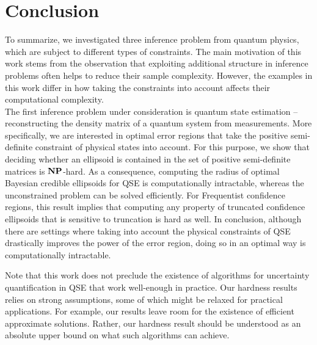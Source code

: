 
\chapter{Conclusion}%
\label{chap:conclusion}

To summarize, we investigated three inference problem from quantum physics, which are subject to different types of constraints.
The main motivation of this work stems from the observation that exploiting additional structure in inference problems often helps to reduce their sample complexity.
However, the examples in this work differ in how taking the constraints into account affects their computational complexity.\\



The first inference problem under consideration is quantum state estimation -- reconstructing the density matrix of a quantum system from measurements.
More specifically, we are interested in optimal error regions that take the positive semi-definite constraint of physical states into account.
For this purpose, we show that deciding whether an ellipsoid is contained in the set of positive semi-definite matrices is $\mathbf{NP}$-hard.
As a consequence, computing the radius of optimal Bayesian credible ellipsoids for QSE is computationally intractable, whereas the unconstrained problem can be solved efficiently.
For Frequentist confidence regions, this result implies that computing any property of truncated confidence ellipsoids that is sensitive to truncation is hard as well.
In conclusion, although there are settings where taking into account the physical constraints of QSE drastically improves the power of the error region, doing so in an optimal way is computationally intractable.

Note that this work does not preclude the existence of algorithms for uncertainty quantification in QSE that work well-enough in practice.
Our hardness results relies on strong assumptions, some of which might be relaxed for practical applications.
For example, our results leave room for the existence of efficient approximate solutions.
Rather, our hardness result should be understood as an absolute upper bound on what such algorithms can achieve.\\



